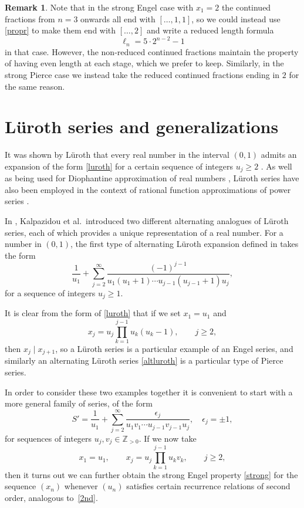 \documentclass[12pt,a4paper]{amsart}
\theoremstyle{definition}
\newtheorem{remark}[theorem]{Remark}
\numberwithin{equation}{section}
\newcommand\eps{{\epsilon}}
\newcommand{\Zp}{\mathbb{Z}_{>0}}
\begin{document}
\begin{remark}
Note that in the strong Engel case with $x_1=2$ 
the %
continued fractions from $n=3$ onwards all end with $[\ldots,1,1]$, so 
we could instead use \eqref{propr} to make them end with $[\ldots,2]$ and write a reduced length 
formula 
\[
\ell_n = 5\cdot 2^{n-2}-1
\] 
in that case. However, the non-reduced continued fractions 
maintain the property of having even length at each stage, which we prefer to keep. 
Similarly, in the strong Pierce case we instead take the reduced continued fractions ending in $2$ for the same reason.
\end{remark} 

\section{L\"{u}roth series and generalizations}
\label{luroths}

It was shown by L\"uroth that every real number in the interval $(0,1)$ admits an expansion of the form 
\eqref{luroth} for a certain sequence of integers $u_j\geq 2$ \cite{lurothoriginal}. As well 
as being used for Diophantine approximation of real numbers \cite{CWZ, DaKr}, 
L\"uroth series have also been employed in the context of rational function 
approximations of power series \cite{KnKn1, KnKn2}. 

In \cite{kkk}, Kalpazidou et al.\ introduced two different alternating analogues of L\"uroth series, each of 
which provides a unique representation of a real number. For a number in $(0,1)$, the first 
type of alternating L\"uroth expansion defined in \cite{kkk} takes the form 
\begin{equation}
\label{altluroth} 
 \frac{1}{u_1} +\sum_{j=2}^{\infty} \frac{(-1)^{j-1}}{u_{1}(u_{1}+1) \cdots 
  u_{j-1}(u_{j-1}+1) u_{j}}, 
\end{equation} 
for a sequence of integers $u_j\geq 1$. 

It is clear from the form of \eqref{luroth} that if we set $x_1=u_1$ and 
\[ 
x_j =u_j \prod_{k=1}^{j-1} u_k(u_k-1), \qquad j\geq 2, 
\] 
then $x_j \mid x_{j+1}$, so a L\"uroth series is a particular example of an Engel series, 
and similarly an alternating L\"uroth series \eqref{altluroth} is a particular type of Pierce series. 

In order to consider these two examples together it is convenient to start with a more general family of series, of the form 
\begin{equation}
\label{sfam}
  S' = \frac{1}{u_1} +\sum_{j=2}^{\infty} \frac{\eps_{j}}{u_{1}v_1 \cdots 
  u_{j-1}v_{j-1} u_{j}}, \quad \eps_j=\pm 1, 
\end{equation} 
for sequences of integers $u_j,v_j\in\Zp$. 
If we now take 
\begin{equation}
\label{xudef} 
x_1=u_1, \qquad 
x_j =u_j \prod_{k=1}^{j-1} u_kv_k, \qquad j\geq 2, 
\end{equation} 
then it turns out we can further obtain the strong Engel property \eqref{strong} for the sequence 
$(x_n)$ whenever $(u_n)$ satisfies certain recurrence relations of second order, analogous to~\eqref{2nd}. 
\end{document}
